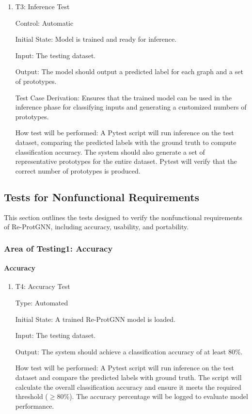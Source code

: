 \documentclass[12pt, titlepage]{article}
\begin{document}
\begin{enumerate}
					
\item{T3: Inference Test\\}

Control: Automatic
					
Initial State: Model is trained and ready for inference.
					
Input: The testing dataset.
					
Output: The model should output a predicted label for each graph and a set of prototypes.

Test Case Derivation: Ensures that the trained model can be used in the inference phase for classifying inputs and generating a customized numbers of prototypes.

How test will be performed: A Pytest script will run inference on the test dataset, comparing the predicted labels with the ground truth to compute classification accuracy. The system should also generate a set of representative prototypes for the entire dataset. Pytest will verify that the correct number of prototypes is produced.

\end{enumerate}


\subsection{Tests for Nonfunctional Requirements}

This section outlines the tests designed to verify the nonfunctional requirements of Re-ProtGNN, including accuracy, usability, and portability.

\subsubsection{Area of Testing1: Accuracy}
		
\paragraph{Accuracy}

\begin{enumerate}

\item{T4: Accuracy Test\\}

Type: Automated
					
Initial State: A trained Re-ProtGNN model is loaded.
					
Input: The testing dataset.
					
Output: The system should achieve a classification accuracy of at least 80\%.
					
How test will be performed: A Pytest script will run inference on the test dataset and compare the predicted labels with ground truth. The script will calculate the overall classification accuracy and ensure it meets the required threshold ($\geq 80\%$). The accuracy percentage will be logged to evaluate model performance.

\end{enumerate}
\end{document}
